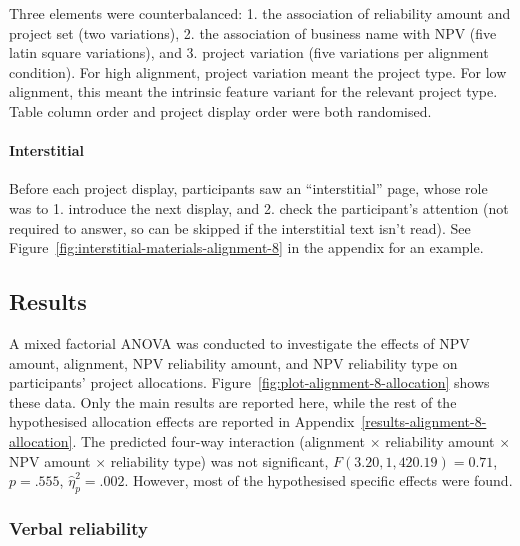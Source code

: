 \documentclass[a4paper, nobind, dvipsnames]{templates/ociamthesis}
\theoremstyle{definition}
\theoremstyle{definition}
\theoremstyle{definition}
\theoremstyle{definition}
\theoremstyle{remark}
\begin{document}
Three elements were counterbalanced: 1. the association of reliability amount
and project set (two variations), 2. the association of business name with NPV
(five latin square variations), and 3. project variation (five variations per
alignment condition). For high alignment, project variation meant the project
type. For low alignment, this meant the intrinsic feature variant for the
relevant project type. Table column order and project display order were both
randomised.

\paragraph{Interstitial}

Before each project display, participants saw an ``interstitial'' page, whose role
was to 1. introduce the next display, and 2. check the participant's attention
(not required to answer, so can be skipped if the interstitial text isn't read).
See Figure~\ref{fig:interstitial-materials-alignment-8} in the appendix for an
example.

\subsection{Results}

A mixed factorial ANOVA was conducted to investigate the effects of NPV amount,
alignment, NPV reliability amount, and NPV reliability type on participants'
project allocations. Figure~\ref{fig:plot-alignment-8-allocation} shows these
data. Only the main results are reported here, while the rest of the
hypothesised allocation effects are reported in
Appendix~\ref{results-alignment-8-allocation}. The predicted four-way
interaction (alignment \(\times\) reliability amount \(\times\) NPV amount \(\times\)
reliability type) was not significant,
\(F(3.20, 1,420.19) = 0.71\), \(p = .555\), \(\hat{\eta}^2_p = .002\). However, most of the
hypothesised specific effects were found.

\subsubsection{Verbal reliability}
\end{document}
